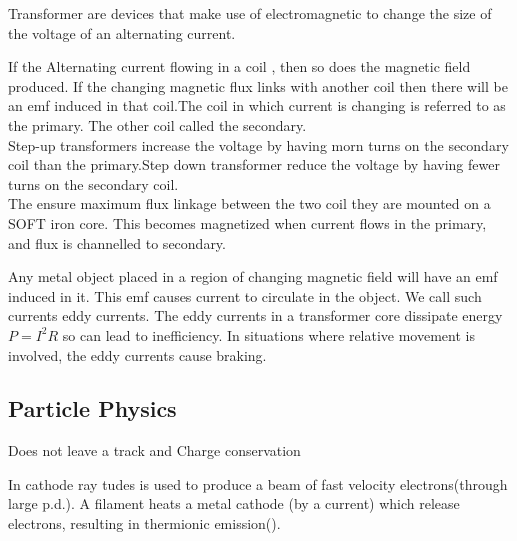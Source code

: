 \documentclass[a4paper]{article}
\begin{document}
\begin{defi}
Transformer are devices that make use of electromagnetic to change the size of the voltage of an alternating current.

If the Alternating current flowing in a coil , then so does the magnetic field produced. If the changing magnetic flux links with another coil then there will be an emf induced in that coil.The coil in which current is changing is referred to as the primary. The other coil called the secondary.\\

Step-up transformers increase the voltage by having morn turns on the secondary coil than the primary.Step down transformer reduce the voltage by having fewer turns on the secondary coil.\\

The ensure maximum flux linkage between the two coil they are mounted on a SOFT iron core. This becomes magnetized when current flows in the primary, and flux is channelled to secondary.


\end{defi}

\begin{defi}
Any metal object placed in a region of changing magnetic field will have an emf induced in it. This emf causes current to circulate in the object. We call such currents eddy currents. The eddy currents in a transformer core dissipate energy $P=I^2R$ so can lead to inefficiency. In situations where relative movement is involved, the eddy currents cause braking.
\end{defi}

\subsection{Particle Physics}

\begin{defi}
Does not leave a track and Charge conservation
\end{defi}

\begin{defi}
In cathode ray tudes is used to produce a beam of fast velocity electrons(through large p.d.). A filament heats a metal cathode (by a current) which release electrons, resulting in thermionic emission().
\end{defi}
\end{document}
